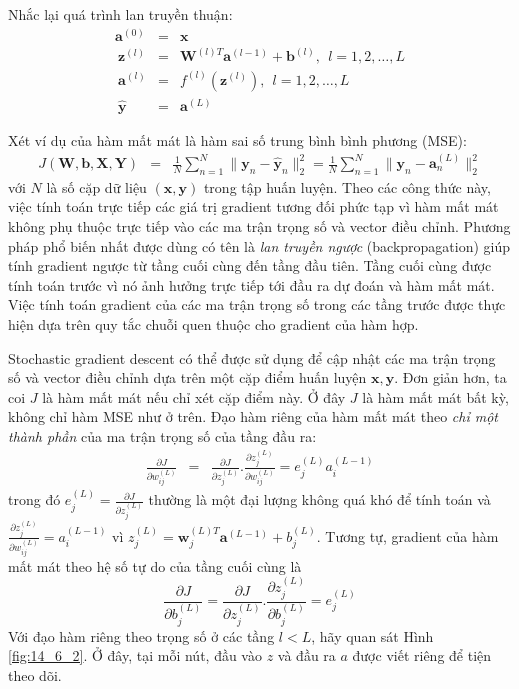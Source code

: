 Nhắc lại quá trình lan truyền thuận:
\begin{eqnarray}
\mathbf{a}^{(0)} &=& \mathbf{x} \\\
\mathbf{z}^{(l)}  &=& \mathbf{W}^{(l)T}\mathbf{a}^{(l-1)} + \mathbf{b}^{(l)},~~ l =  1, 2, \dots, L \\\
\mathbf{a}^{(l)} &=& f^{(l)}(\mathbf{z}^{(l)}), ~~ l =  1, 2, \dots, L \\\
\mathbf{\hat{y}} &=& \mathbf{a}^{(L)}
\end{eqnarray}


Xét ví dụ của hàm mất mát là hàm sai số trung bình bình phương (MSE):
\begin{eqnarray}
J(\mathbf{W, b, X, Y}) &=& \frac{1}{N}\sum_{n=1}^N \| \mathbf{y}_n - \mathbf{\hat{y}}_n\|_2^2
=\frac{1}{N}\sum_{n=1}^N \| \mathbf{y}_n - \mathbf{a}_n^{(L)}\|_2^2
\end{eqnarray}
với $N$ là số cặp dữ liệu $(\mathbf{x}, \mathbf{y})$ trong tập huấn luyện. Theo
các công thức này, việc tính toán trực tiếp các giá trị gradient tương đối phức
tạp vì hàm mất mát không phụ thuộc trực tiếp vào các ma trận trọng số và vector
điều chỉnh. Phương pháp phổ biến nhất được dùng có tên là \textit{lan truyền ngược}
(backpropagation) giúp tính gradient ngược từ tầng cuối cùng đến tầng đầu tiên.
Tầng cuối cùng được tính toán trước vì nó ảnh hưởng trực tiếp tới {đầu ra dự
đoán} và hàm mất mát. Việc tính toán gradient của các ma trận trọng số trong các
tầng trước được thực hiện dựa trên quy tắc chuỗi quen thuộc cho {gradient của hàm
hợp}.

Stochastic gradient descent có thể được sử dụng để cập nhật các ma trận trọng số và vector điều chỉnh dựa trên một cặp điểm huấn luyện $\mathbf{x, y}$. Đơn giản hơn, ta coi $J$ là hàm mất mát nếu chỉ xét cặp điểm này. Ở đây $J$ là hàm mất mát bất kỳ, không chỉ hàm MSE như ở trên.
Đạo hàm riêng của hàm mất mát theo \textit{chỉ một thành phần} của ma trận trọng số
của tầng đầu ra:
\begin{eqnarray}
\frac{\partial J}{\partial w_{ij}^{(L)}} &=& \frac{\partial J}{\partial
z_j^{(L)}}. \frac{\partial z_j^{(L)}}{\partial w_{ij}^{(L)}} = e_j^{(L)} a_i^{(L-1)}
\end{eqnarray}
trong đó $\displaystyle e_j^{(L)} = \frac{\partial J}{\partial z_j^{(L)}} $
thường là một đại
lượng {không quá khó để tính toán} và $\displaystyle\frac{\partial
z_j^{(L)}}{\partial w_{ij}^{(L)}}  = a_i^{(L-1)}$ vì $z_j^{(L)} = \mathbf{w}_j^{(L)T}\mathbf{a}^{(L-1)} + b_j^{(L)}$.
Tương tự, gradient của hàm mất mát theo hệ số tự do của tầng cuối cùng là
\begin{equation}
\frac{\partial J}{\partial b_{j}^{(L)}} = \frac{\partial J}{\partial z_j^{(L)}}. \frac{\partial z_j^{(L)}}{\partial b_{j}^{(L)}} = e_j^{(L)}
\end{equation}
Với đạo hàm riêng theo trọng số ở các tầng $l < L$, hãy quan sát Hình
\ref{fig:14_6_2}. Ở đây, tại mỗi nút, đầu vào $z$ và đầu ra $a$ được viết
riêng để tiện theo dõi.

